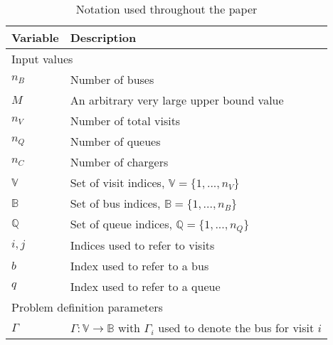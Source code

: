 \documentclass[utf8]{FrontiersinHarvard}
\begin{document}
\begin{table}[!htpb]
  \caption{Notation used throughout the paper}
  \label{tab:variables}
  \centering
  \begin{tabularx}{\textwidth}{l l}
    \toprule
    \textbf{Variable} & \textbf{Description}                                                                               \\
    \toprule
    \multicolumn{2}{l}{Input values}                                                                                       \\
    $n_B$        & Number of buses                                                                                         \\
    $M$          & An arbitrary very large upper bound value                                                               \\
    $n_V$        & Number of total visits                                                                                  \\
    $n_Q$        & Number of queues                                                                                        \\
    $n_C$ 	 & Number of chargers                                                                                      \\
    $\mathbb{V}$ & Set of visit indices, $\mathbb{V} = \{1, ..., n_V\}$                                                    \\
    $\mathbb{B}$ & Set of bus indices, $\mathbb{B} = \{1, ..., n_B\}$                                                      \\
    $\mathbb{Q}$          & Set of queue indices, $\mathbb{Q} = \{1, ..., n_Q\}$                                                             \\
    $i,j$        & Indices used to refer to visits                                                                         \\
    $b$ 	 & Index used to refer to a bus                                                                            \\
    $q$ 	 & Index used to refer to a queue                                                                          \\
    \hline
    \multicolumn{2}{l}{Problem definition parameters}                                                                      \\
    $\Gamma$   & $\Gamma: \mathbb{V} \rightarrow \mathbb{B}$ with $\Gamma_i$ used to denote the bus for visit $i$                                   \\

\end{tabularx}
\end{table}
\end{document}

